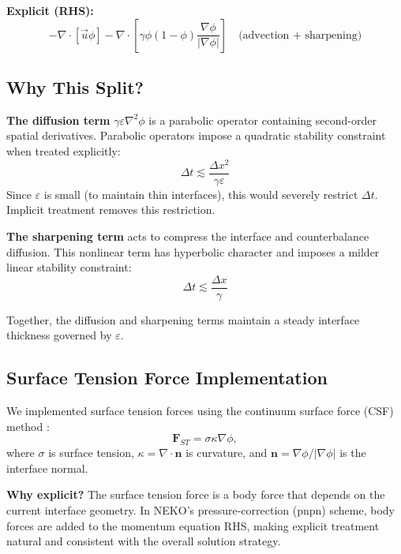 \documentclass{article}
\begin{document}
\noindent\textbf{Explicit (RHS):}
\begin{equation}
    -\nabla \cdot [\vec{u} \phi] - \nabla \cdot \left[\gamma \phi(1-\phi) \frac{\nabla \phi}{|\nabla \phi|}\right] \quad \text{(advection + sharpening)}
\end{equation}

\subsection{Why This Split?}

\textbf{The diffusion term} $\gamma \varepsilon \nabla^2 \phi$ is a parabolic operator containing second-order spatial derivatives. Parabolic operators impose a quadratic stability constraint when treated explicitly:
\begin{equation}
    \Delta t \lesssim \frac{\Delta x^2}{\gamma \varepsilon}
\end{equation}
Since $\varepsilon$ is small (to maintain thin interfaces), this would severely restrict $\Delta t$. Implicit treatment removes this restriction.

\textbf{The sharpening term} acts to compress the interface and counterbalance diffusion. This nonlinear term has hyperbolic character and imposes a milder linear stability constraint:
\begin{equation}
    \Delta t \lesssim \frac{\Delta x}{\gamma}
\end{equation}

Together, the diffusion and sharpening terms maintain a steady interface thickness governed by $\varepsilon$.

\subsection{Surface Tension Force Implementation}

We implemented surface tension forces using the continuum surface force (CSF) method \cite{brackbillContinuumMethodModeling1992}:
\begin{equation}
    \bm{F}_{ST} = \sigma \kappa \nabla \phi,
\end{equation}
where $\sigma$ is surface tension, $\kappa = \nabla \cdot \bm{n}$ is curvature, and $\bm{n} = \nabla \phi/|\nabla \phi|$ is the interface normal.

\textbf{Why explicit?} The surface tension force is a body force that depends on the current interface geometry. In NEKO's pressure-correction (pnpn) scheme, body forces are added to the momentum equation RHS, making explicit treatment natural and consistent with the overall solution strategy.
\end{document}
